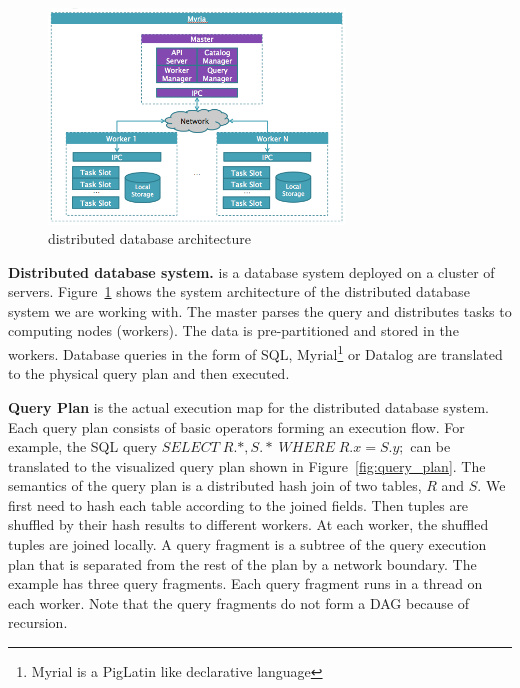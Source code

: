 \documentclass[11pt]{scrartcl}
\begin{document}
\begin{figure}
 \begin{center}
     \includegraphics[width=0.7\textwidth]{myria.png}
   \end{center}
  \caption{distributed database architecture}
  \label{fig:myria_arc}
\end{figure}


\noindent\textbf{Distributed database system.} is a database system deployed on a cluster of servers. Figure~\ref{fig:myria_arc} shows the system architecture of the distributed database system we are working with. The master parses the query and distributes tasks to computing nodes (workers). The data is pre-partitioned and stored in the workers. Database queries in the form of SQL, Myrial\footnote{Myrial is a PigLatin like declarative language} or Datalog are translated to the physical query plan and then executed.

\noindent\textbf{Query Plan} is the actual execution map for the distributed database system.  Each query plan consists of basic operators forming an execution flow. For example, the SQL query $SELECT \; R.*, S.*  \; WHERE \; R.x=S.y ;$ can be translated to the visualized query plan shown in Figure~\ref{fig:query_plan}. The semantics of the query plan is a distributed hash join of two tables, $R$ and $S$. We first need to hash each table according to the joined fields. Then tuples are shuffled by their hash results to different workers. At each worker, the shuffled tuples are joined locally. A query fragment is a subtree of the query execution plan that is separated from the rest of the plan by a network boundary. The example has three query fragments. Each query fragment runs in a thread on each worker. Note that the query fragments do not form a DAG because of recursion.
\end{document}
